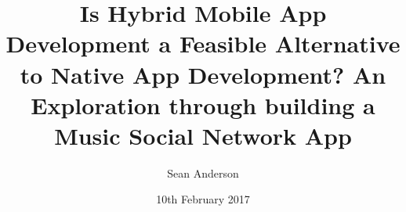 
\title{Is Hybrid Mobile App Development  a Feasible Alternative to Native App Development? An Exploration through building a Music Social Network App}

\author{Sean Anderson}




\date{10th February 2017} %




\maketitle



